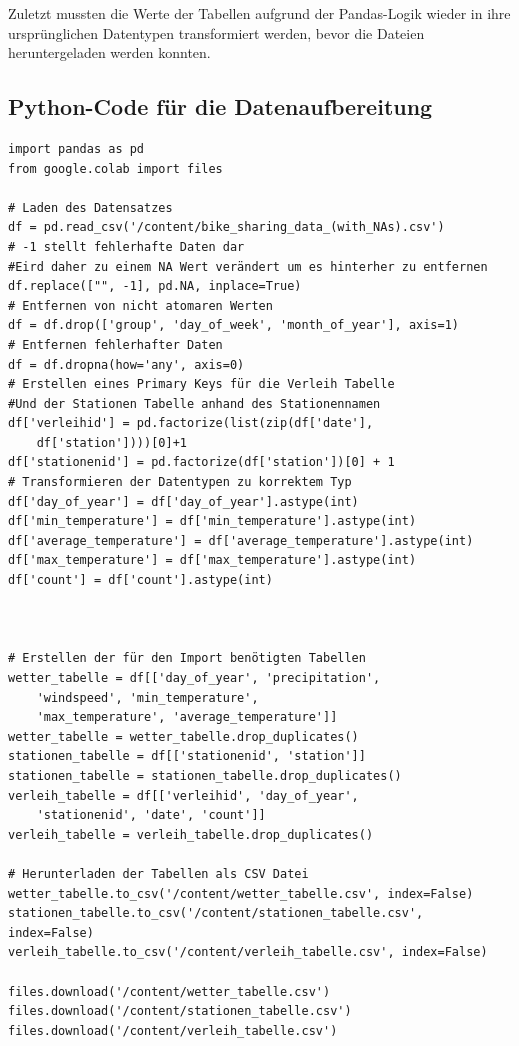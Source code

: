 \documentclass{article}
\begin{document}
Zuletzt mussten die Werte der Tabellen aufgrund der Pandas-Logik wieder in ihre ursprünglichen Datentypen transformiert werden, bevor die Dateien heruntergeladen werden konnten.

\subsection*{Python-Code für die Datenaufbereitung}

\begin{verbatim}
import pandas as pd
from google.colab import files

# Laden des Datensatzes
df = pd.read_csv('/content/bike_sharing_data_(with_NAs).csv')
# -1 stellt fehlerhafte Daten dar
#Eird daher zu einem NA Wert verändert um es hinterher zu entfernen
df.replace(["", -1], pd.NA, inplace=True)
# Entfernen von nicht atomaren Werten
df = df.drop(['group', 'day_of_week', 'month_of_year'], axis=1)
# Entfernen fehlerhafter Daten
df = df.dropna(how='any', axis=0)
# Erstellen eines Primary Keys für die Verleih Tabelle
#Und der Stationen Tabelle anhand des Stationennamen
df['verleihid'] = pd.factorize(list(zip(df['date'], 
    df['station'])))[0]+1
df['stationenid'] = pd.factorize(df['station'])[0] + 1
# Transformieren der Datentypen zu korrektem Typ
df['day_of_year'] = df['day_of_year'].astype(int)
df['min_temperature'] = df['min_temperature'].astype(int)
df['average_temperature'] = df['average_temperature'].astype(int)
df['max_temperature'] = df['max_temperature'].astype(int)
df['count'] = df['count'].astype(int)



# Erstellen der für den Import benötigten Tabellen
wetter_tabelle = df[['day_of_year', 'precipitation',
    'windspeed', 'min_temperature', 
    'max_temperature', 'average_temperature']]
wetter_tabelle = wetter_tabelle.drop_duplicates()
stationen_tabelle = df[['stationenid', 'station']]
stationen_tabelle = stationen_tabelle.drop_duplicates()
verleih_tabelle = df[['verleihid', 'day_of_year', 
    'stationenid', 'date', 'count']]
verleih_tabelle = verleih_tabelle.drop_duplicates()

# Herunterladen der Tabellen als CSV Datei
wetter_tabelle.to_csv('/content/wetter_tabelle.csv', index=False)
stationen_tabelle.to_csv('/content/stationen_tabelle.csv', index=False)
verleih_tabelle.to_csv('/content/verleih_tabelle.csv', index=False)

files.download('/content/wetter_tabelle.csv')
files.download('/content/stationen_tabelle.csv')
files.download('/content/verleih_tabelle.csv')
\end{verbatim}
\end{document}
